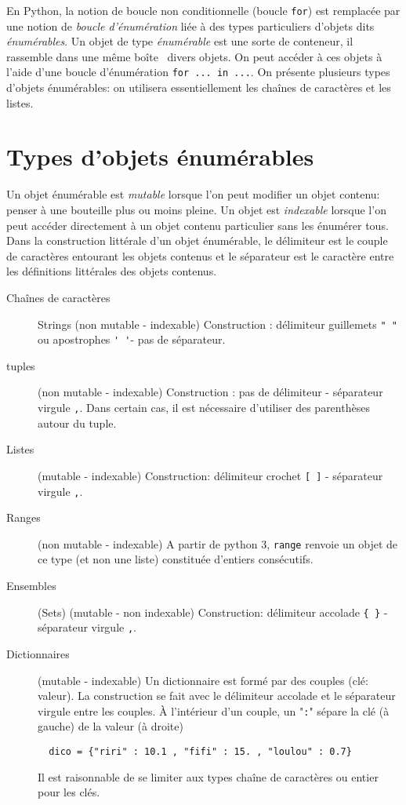 
    
En Python, la notion de boucle non conditionnelle (boucle \texttt{for}) est remplacée par une notion de \emph{boucle d'énumération} liée à des types particuliers d'objets dits \emph{énumérables}.\newline
Un objet de type \emph{énumérable} est une sorte de conteneur, il rassemble \og dans une même boîte\fg~ divers objets. On peut accéder à ces objets à l'aide d'une boucle d'énumération \texttt{for ... in ...}.\newline
On présente plusieurs types d'objets énumérables: on utilisera essentiellement les chaînes de caractères et les listes.

\section{Types d'objets énumérables}
Un objet énumérable est \emph{mutable}  lorsque l'on peut modifier un objet contenu: penser à une bouteille plus ou moins pleine.\newline
Un objet est \emph{indexable}  lorsque l'on peut accéder directement à un objet contenu particulier sans les énumérer tous.\newline
Dans la construction littérale d'un objet énumérable, le délimiteur  est le couple de caractères entourant les objets contenus et le séparateur est le caractère entre les définitions littérales des objets contenus.
\begin{description}
 \item [Chaînes de caractères] Strings (non mutable - indexable) Construction : délimiteur guillemets \verb|" "| ou apostrophes \verb|' '|- pas de séparateur.
 \item [tuples] (non mutable - indexable) Construction : pas de délimiteur - séparateur virgule \verb|,|. Dans certain cas, il est nécessaire d'utiliser des parenthèses autour du tuple.
 \item [Listes] (mutable - indexable) Construction: délimiteur crochet \verb|[ ]| - séparateur virgule \verb|,|.
 \item [Ranges] (non mutable - indexable) A partir de python 3, \texttt{range} renvoie un objet de ce type (et non une liste) constituée d'entiers consécutifs.
 \item [Ensembles] (Sets) (mutable - non indexable) Construction: délimiteur accolade \verb|{ }| - séparateur virgule \verb|,|.
 \item [Dictionnaires] (mutable - indexable) Un dictionnaire est formé par des couples (clé: valeur). La construction se fait avec le délimiteur accolade et le séparateur virgule entre les couples. \`A l'intérieur d'un couple, un "\verb|:|" sépare la clé (à gauche) de la valeur (à droite)
 \begin{verbatim}
  dico = {"riri" : 10.1 , "fifi" : 15. , "loulou" : 0.7} \end{verbatim}
 Il est raisonnable de se limiter aux types chaîne de caractères ou entier pour les clés.
\end{description}
